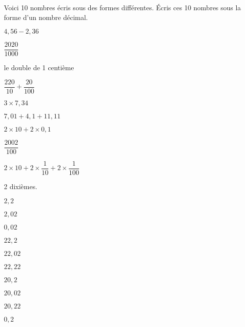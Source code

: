 Voici 10 nombres écris sous des formes différentes. \'Ecris ces 10
  nombres sous la forme d'un nombre décimal.
\begin{multicols}{2}
\begin{myenumerate}
\item $4,56-2,36$
\item $\dfrac{2020}{1000}$
\item le double de 1 centième
\item $\dfrac{220}{10}+\dfrac{20}{100}$
\item $3\times7,34$
\item $7,01+4,1+11,11$
\item $2\times10+2\times0,1$
\item $\dfrac{2002}{100}$
\item $2\times10+2\times\dfrac1{10}+2\times\dfrac1{100}$
\item 2 dixièmes.
\end{myenumerate}
\end{multicols}
  \begin{multicols}{5}
    \begin{myenumerate}
      \item $2,2$
      \item $2,02$
      \item $0,02$
      \item $22,2$
      \item $22,02$
      \item $22,22$
      \item $20,2$
      \item $20,02$
      \item $20,22$
      \item $0,2$
    \end{myenumerate}
  \end{multicols}